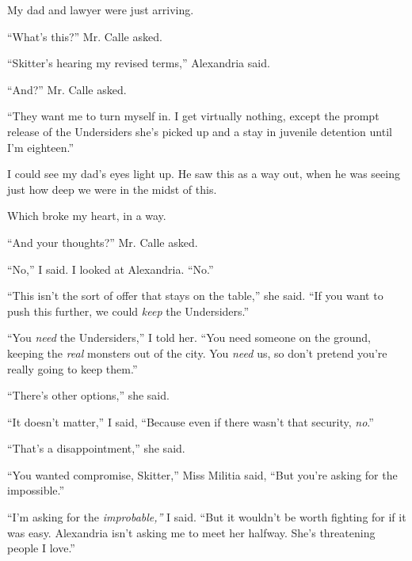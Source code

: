 My dad and lawyer were just arriving.



``What's this?'' Mr. Calle asked.



``Skitter's hearing my revised terms,'' Alexandria said.



``And?'' Mr. Calle asked.



``They want me to turn myself in.  I get virtually nothing, except the prompt release of the Undersiders she's picked up and a stay in juvenile detention until I'm eighteen.''



I could see my dad's eyes light up.  He saw this as a way out, when he was seeing just how deep we were in the midst of this.



Which broke my heart, in a way.



``And your thoughts?'' Mr. Calle asked.



``No,'' I said.  I looked at Alexandria.  ``No.''



``This isn't the sort of offer that stays on the table,'' she said.  ``If you want to push this further, we could \emph{keep} the Undersiders.''



``You \emph{need} the Undersiders,'' I told her.  ``You need someone on the ground, keeping the \emph{real} monsters out of the city.  You \emph{need} us, so don't pretend you're really going to keep them.''



``There's other options,'' she said.



``It doesn't matter,'' I said, ``Because even if there wasn't that security, \emph{no}.''



``That's a disappointment,'' she said.



``You wanted compromise, Skitter,'' Miss Militia said, ``But you're asking for the impossible.''



``I'm asking for the \emph{improbable,'' }I said.  ``But it wouldn't be worth fighting for if it was easy.  Alexandria isn't asking me to meet her halfway.  She's threatening people I love.''



